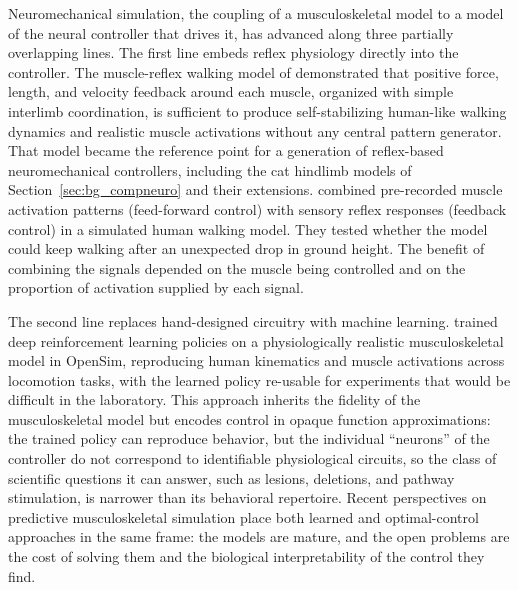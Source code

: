Neuromechanical simulation, the coupling of a musculoskeletal model to a model of the neural controller that drives it, has advanced along three partially overlapping lines. The first line embeds reflex physiology directly into the controller. The muscle-reflex walking model of \citet{geyer_musclereflex_2010} demonstrated that positive force, length, and velocity feedback around each muscle, organized with simple interlimb coordination, is sufficient to produce self-stabilizing human-like walking dynamics and realistic muscle activations without any central pattern generator. That model became the reference point for a generation of reflex-based neuromechanical controllers, including the cat hindlimb models of Section~\ref{sec:bg_compneuro} \citep{markin_afferent_2010, shevtsova_modeling_2016} and their extensions. \citet{haeufle_benefit_2018} combined pre-recorded muscle activation patterns (feed-forward control) with sensory reflex responses (feedback control) in a simulated human walking model. They tested whether the model could keep walking after an unexpected drop in ground height. The benefit of combining the signals depended on the muscle being controlled and on the proportion of activation supplied by each signal.

The second line replaces hand-designed circuitry with machine learning. \citet{song_deep_2021} trained deep reinforcement learning policies on a physiologically realistic musculoskeletal model in OpenSim, reproducing human kinematics and muscle activations across locomotion tasks, with the learned policy re-usable for experiments that would be difficult in the laboratory. This approach inherits the fidelity of the musculoskeletal model but encodes control in opaque function approximations: the trained policy can reproduce behavior, but the individual ``neurons'' of the controller do not correspond to identifiable physiological circuits, so the class of scientific questions it can answer, such as lesions, deletions, and pathway stimulation, is narrower than its behavioral repertoire. Recent perspectives on predictive musculoskeletal simulation \citep{degroote_perspective_2021} place both learned and optimal-control approaches in the same frame: the models are mature, and the open problems are the cost of solving them and the biological interpretability of the control they find.

